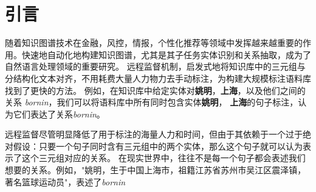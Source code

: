 \documentclass[UTF8]{csoarticle}
\begin{document}




\maketitle



\section{引言}
随着知识图谱技术在金融，风控，情报，个性化推荐等领域中发挥越来越重要的作用。快速地自动化地构建知识图谱，尤其是其子任务实体识别和关系抽取，成为了自然语言处理领域的重要研究。
远程监督机制，启发式地将知识库中的三元组与分结构化文本对齐，不用耗费大量人力物力去手动标注，为构建大规模标注语料库找到了更快的方法。
例如，在知识库中给定实体对\textbf{姚明}，\textbf{上海}，以及他们之间的关系 \textit{born\uline{}in}，我们可以将语料库中所有同时包含实体\textbf{姚明}， \textbf{上海}的句子标注，认为它们表达了关系\textit{born\uline{}in}。

远程监督尽管明显降低了用于标注的海量人力和时间，但由于其依赖于一个过于绝对假设：只要一个句子同时含有三元组中的两个实体，那么这个句子就可以认为表示了这个三元组对应的关系。
在现实世界中，往往不是每一个句子都会表述我们想要的关系。例如，"姚明，生于中国上海市，祖籍江苏省苏州市吴江区震泽镇，著名篮球运动员"，表述了\textit{born\uline{}in}
\end{document}
